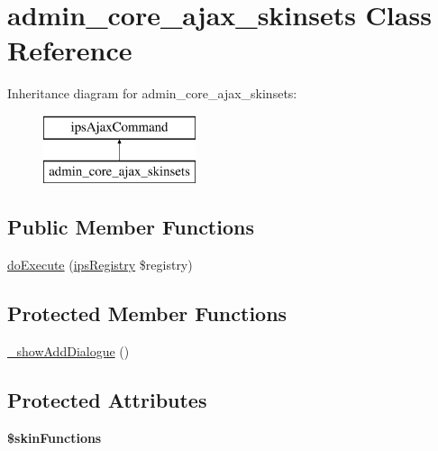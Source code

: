 \hypertarget{classadmin__core__ajax__skinsets}{\section{admin\-\_\-core\-\_\-ajax\-\_\-skinsets Class Reference}
\label{classadmin__core__ajax__skinsets}
}
Inheritance diagram for admin\-\_\-core\-\_\-ajax\-\_\-skinsets\-:\begin{figure}[H]
\begin{center}
\leavevmode
\includegraphics[height=2.000000cm]{classadmin__core__ajax__skinsets}
\end{center}
\end{figure}
\subsection*{Public Member Functions}
\begin{DoxyCompactItemize}
\item 
\hyperlink{classadmin__core__ajax__skinsets_afbc4e912a0604b94d47d66744c64d8ba}{do\-Execute} (\hyperlink{classips_registry}{ips\-Registry} \$registry)
\end{DoxyCompactItemize}
\subsection*{Protected Member Functions}
\begin{DoxyCompactItemize}
\item 
\hyperlink{classadmin__core__ajax__skinsets_aa78a57b632534e120170c8944a599bb7}{\-\_\-show\-Add\-Dialogue} ()
\end{DoxyCompactItemize}
\subsection*{Protected Attributes}
\begin{DoxyCompactItemize}
\item 
\hypertarget{classadmin__core__ajax__skinsets_a41d90687021c6f16184b43666509dee8}{{\bfseries \$skin\-Functions}}\label{classadmin__core__ajax__skinsets_a41d90687021c6f16184b43666509dee8}

\end{DoxyCompactItemize}


